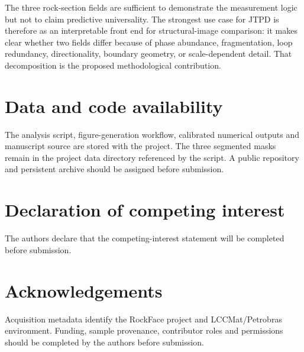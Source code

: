 \documentclass[preprint,12pt,authoryear]{elsarticle}
\begin{document}
The three rock-section fields are sufficient to demonstrate the measurement logic but not to claim predictive universality. The strongest use case for JTPD is therefore as an interpretable front end for structural-image comparison: it makes clear whether two fields differ because of phase abundance, fragmentation, loop redundancy, directionality, boundary geometry, or scale-dependent detail. That decomposition is the proposed methodological contribution.

\section*{Data and code availability}
The analysis script, figure-generation workflow, calibrated numerical outputs and manuscript source are stored with the project. The three segmented masks remain in the project data directory referenced by the script. A public repository and persistent archive should be assigned before submission.

\section*{Declaration of competing interest}
The authors declare that the competing-interest statement will be completed before submission.

\section*{Acknowledgements}
Acquisition metadata identify the RockFace project and LCCMat/Petrobras environment. Funding, sample provenance, contributor roles and permissions should be completed by the authors before submission.



\end{document}
